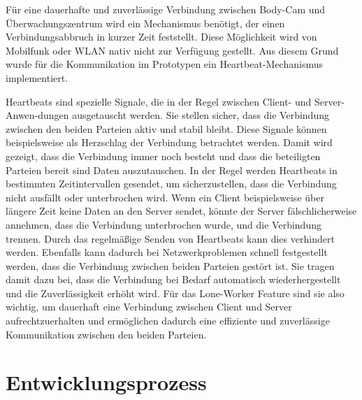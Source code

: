 \documentclass[thesis.tex]{subfiles}
\begin{document}
Für eine dauerhafte und zuverlässige Verbindung zwischen Body-Cam und Überwachungszentrum wird ein Mechanismus benötigt, der einen Verbindungsabbruch in kurzer Zeit feststellt.
Diese Möglichkeit wird von Mobilfunk oder WLAN nativ nicht zur Verfügung gestellt.
Aus diesem Grund wurde für die Kommunikation im Prototypen ein Heartbeat-Mechanismus implementiert.

Heartbeats sind spezielle Signale, die in der Regel zwischen Client- und Server-Anwen-dungen ausgetauscht werden.
Sie stellen sicher, dass die Verbindung zwischen den beiden Parteien aktiv und stabil bleibt.
Diese Signale können beispielsweise als \glqq Herzschlag\grqq{} der Verbindung betrachtet werden.
Damit wird gezeigt, dass die Verbindung immer noch besteht und dass die beteiligten Parteien bereit sind Daten auszutauschen.
In der Regel werden Heartbeats in bestimmten Zeitintervallen gesendet, um sicherzustellen, dass die Verbindung nicht ausfällt oder unterbrochen wird.
Wenn ein Client beispielsweise über längere Zeit keine Daten an den Server sendet, könnte der Server fälschlicherweise annehmen, dass die Verbindung unterbrochen wurde, und die Verbindung trennen.
Durch das regelmäßige Senden von Heartbeats kann dies verhindert werden.
Ebenfalls kann dadurch bei Netzwerkproblemen schnell festgestellt werden, dass die Verbindung zwischen beiden Parteien gestört ist.
Sie tragen damit dazu bei, dass die Verbindung bei Bedarf automatisch wiederhergestellt und die Zuverlässigkeit erhöht wird.
Für das Lone-Worker Feature sind sie also wichtig, um dauerhaft eine Verbindung zwischen Client und Server aufrechtzuerhalten und ermöglichen dadurch eine effiziente und zuverlässige Kommunikation zwischen den beiden Parteien.

\section{Entwicklungsprozess}
\end{document}
